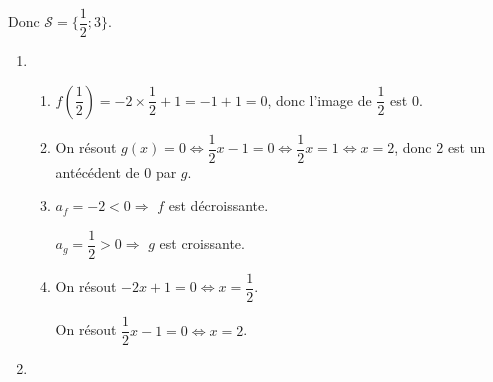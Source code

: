 \documentclass[a4paper]{article}
\begin{document}
\begin{exercice}{}{}
\begin{enumerate}
\begin{enumerate}
      Donc $\mathcal{S}=\{\dfrac{1}{2};3\}$.
        \end{enumerate}
      \end{enumerate}

    \end{exercice}
    


    \begin{exercice}{}{}
    \begin{enumerate}
      \item \begin{enumerate}
        \item $f(\dfrac{1}{2})=-2\times \dfrac{1}{2}+1=-1+1=0$, donc l'image de $\dfrac{1}{2}$ est $0$.
        \item On résout $g(x)=0 \iff \dfrac{1}{2}x-1=0 \iff \dfrac{1}{2}x=1 \iff x=2$, donc $2$ est un antécédent de $0$ par $g$.
        \item $a_f=-2<0 \Longrightarrow $ $f$ est décroissante.
        
        $a_g=\dfrac{1}{2}>0 \Longrightarrow $ $g$ est croissante.

        \item On résout $-2x+1=0 \iff x=\dfrac{1}{2}$.
        
        \begin{center}
        \end{center}

        On résout $\dfrac{1}{2}x-1=0 \iff x=2$.
        
		\begin{center}
		\end{center}

      \end{enumerate}
\item 
      \begin{center}
        \begin{tikzpicture}[x=1cm,y=1cm, %
          xmin=-2,xmax=4, xgrille=1,xgrilles=0.5, %
          ymin=-3,ymax=4,ygrille=1,ygrilles=0.5] %
          

\end{tikzpicture}
\end{center}
\end{enumerate}
\end{exercice}
\end{document}
